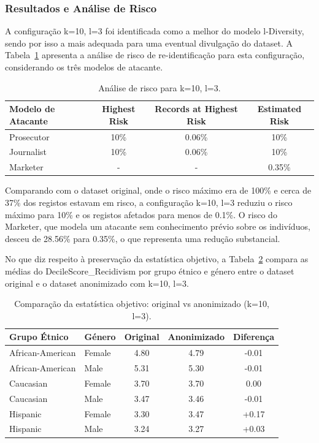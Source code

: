 \subsubsection{Resultados e Análise de Risco}

A configuração k=10, l=3 foi identificada como a melhor do modelo l-Diversity, sendo por isso a mais adequada para uma eventual divulgação do dataset. A Tabela~\ref{tab:risco_ldiv} apresenta a análise de risco de re-identificação para esta configuração, considerando os três modelos de atacante.

\begin{table}[H]
\centering
\caption{Análise de risco para k=10, l=3.}
\label{tab:risco_ldiv}
\begin{tabular}{lccc}
\toprule
\textbf{Modelo de Atacante} & \textbf{Highest Risk} & \textbf{Records at Highest Risk} & \textbf{Estimated Risk} \\
\midrule
Prosecutor & 10\% & 0.06\% & 10\% \\
Journalist & 10\% & 0.06\% & 10\% \\
Marketer & - & - & 0.35\% \\
\bottomrule
\end{tabular}
\end{table}

Comparando com o dataset original, onde o risco máximo era de 100\% e cerca de 37\% dos registos estavam em risco, a configuração k=10, l=3 reduziu o risco máximo para 10\% e os registos afetados para menos de 0.1\%. O risco do Marketer, que modela um atacante sem conhecimento prévio sobre os indivíduos, desceu de 28.56\% para 0.35\%, o que representa uma redução substancial.

No que diz respeito à preservação da estatística objetivo, a Tabela~\ref{tab:comparacao_ldiv} compara as médias do DecileScore\_Recidivism por grupo étnico e género entre o dataset original e o dataset anonimizado com k=10, l=3.

\begin{table}[H]
\centering
\caption{Comparação da estatística objetivo: original vs anonimizado (k=10, l=3).}
\label{tab:comparacao_ldiv}
\begin{tabular}{llccc}
\toprule
\textbf{Grupo Étnico} & \textbf{Género} & \textbf{Original} & \textbf{Anonimizado} & \textbf{Diferença} \\
\midrule
African-American & Female & 4.80 & 4.79 & -0.01 \\
African-American & Male & 5.31 & 5.30 & -0.01 \\
Caucasian & Female & 3.70 & 3.70 & 0.00 \\
Caucasian & Male & 3.47 & 3.46 & -0.01 \\
Hispanic & Female & 3.30 & 3.47 & +0.17 \\
Hispanic & Male & 3.24 & 3.27 & +0.03 \\
\bottomrule
\end{tabular}
\end{table}

